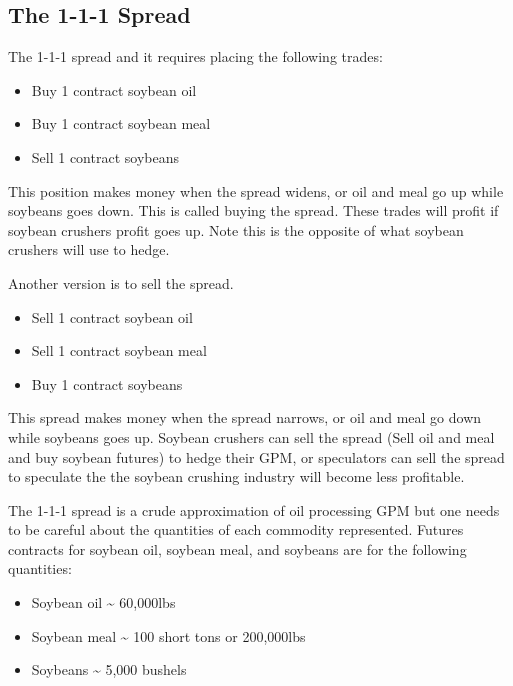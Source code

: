 \documentclass[
]{book}
\providecommand{\tightlist}{%
  \setlength{\itemsep}{0pt}\setlength{\parskip}{0pt}}
\begin{document}
\hypertarget{the-1-1-1-spread}{%
\subsection{The 1-1-1 Spread}\label{the-1-1-1-spread}}

The 1-1-1 spread and it requires placing the following trades:

\begin{itemize}
\tightlist
\item
  Buy 1 contract soybean oil
\item
  Buy 1 contract soybean meal
\item
  Sell 1 contract soybeans
\end{itemize}

This position makes money when the spread widens, or oil and meal go up while soybeans goes down. This is called buying the spread. These trades will profit if soybean crushers profit goes up. Note this is the opposite of what soybean crushers will use to hedge.

Another version is to sell the spread.

\begin{itemize}
\tightlist
\item
  Sell 1 contract soybean oil
\item
  Sell 1 contract soybean meal
\item
  Buy 1 contract soybeans
\end{itemize}

This spread makes money when the spread narrows, or oil and meal go down while soybeans goes up. Soybean crushers can sell the spread (Sell oil and meal and buy soybean futures) to hedge their GPM, or speculators can sell the spread to speculate the the soybean crushing industry will become less profitable.

The 1-1-1 spread is a crude approximation of oil processing GPM but one needs to be careful about the quantities of each commodity represented. Futures contracts for soybean oil, soybean meal, and soybeans are for the following quantities:

\begin{itemize}
\tightlist
\item
  Soybean oil \textasciitilde{} 60,000lbs
\item
  Soybean meal \textasciitilde{} 100 short tons or 200,000lbs
\item
  Soybeans \textasciitilde{} 5,000 bushels
\end{itemize}
\end{document}
